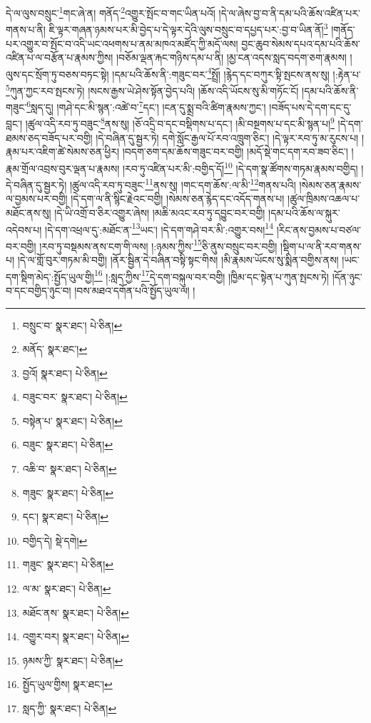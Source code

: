 དེ་ལ་ལུས་བསྲུང་\footnote{བསྲུང་བ་  སྣར་ཐང་།  པེ་ཅིན། }གང་ཞེ་ན། གནོད་\footnote{མནོད་  སྣར་ཐང་། }འགྱུར་སྤོང་བ་གང་ཡིན་པའོ། །དེ་ལ་ཞེས་བྱ་བ་ནི་དམ་པའི་ཆོས་འཛིན་པར་གནས་པ་ནི། ཇི་ལྟར་གཞན་ཉམས་པར་མི་བྱེད་པ་དེ་ལྟར་དེའི་ལུས་བསྲུང་བ་དཔྱད་པར་:བྱ་བ་ཡིན་ནོ།\footnote{བྱའོ།  སྣར་ཐང་།  པེ་ཅིན། } །གནོད་པར་འགྱུར་བ་སྤོང་བ་འདི་ཡང་འཕགས་པ་ནམ་མཁའ་མཛོད་ཀྱི་མདོ་ལས། བྱང་ཆུབ་སེམས་དཔའ་དམ་པའི་ཆོས་འཛིན་པ་ལ་བརྩོན་པ་རྣམས་ཀྱིས། །བཅོམ་ལྡན་རྐང་གཉིས་དམ་པ་ནི། །མྱ་ངན་འདས་སླད་བདག་ཅག་རྣམས། །ལུས་དང་སྲོག་ཏུ་བཅས་བཏང་སྟེ། །དམ་པའི་ཆོས་ནི་:གཟུང་བར་\footnote{བཟུང་བར་  སྣར་ཐང་།  པེ་ཅིན། }སྤྲོ། །རྙེད་དང་བཀུར་སྟི་སྤངས་ནས་སུ། །:རྟེན་པ་\footnote{བསྟེན་པ་  སྣར་ཐང་།  པེ་ཅིན། }ཀུན་ཀྱང་རབ་སྤངས་ཏེ། །སངས་རྒྱས་ཡེ་ཤེས་སྟོན་བྱེད་པའི། །ཆོས་འདི་ཡོངས་སུ་མི་གཏོང་ངོ། །དམ་པའི་ཆོས་ནི་གཟུང་\footnote{བཟུང་  སྣར་ཐང་།  པེ་ཅིན། }སླད་དུ། །གཤེ་དང་མི་སྙན་:འཚེ་བ་\footnote{འཆི་བ་  སྣར་ཐང་།  པེ་ཅིན། }དང་། །ངན་དུ་སྨྲ་བའི་ཚིག་རྣམས་ཀྱང་། །བཟོད་པས་དེ་དག་དང་དུ་བླང་། །ཚུལ་འདི་རབ་ཏུ་བཟུང་\footnote{གཟུང་  སྣར་ཐང་།  པེ་ཅིན། }ནས་སུ། །ཅོ་འདྲི་བ་དང་བསྡིགས་པ་དང་། །མི་བསྔགས་པ་དང་མི་སྙན་པ།\footnote{དང་།  སྣར་ཐང་།  པེ་ཅིན། } །དེ་དག་ཐམས་ཅད་བཟོད་པར་བགྱི། །དེ་བཞིན་དུ་སྦྱར་ཏེ། དགེ་སློང་རྒྱལ་པོ་རབ་འཁྲུག་ཅིང་། །དེ་ལྟར་རབ་ཏུ་མ་རུངས་པ། །རྣམ་པར་འཇིག་ཚེ་སེམས་ཅན་ཕྱིར། །བདག་ཅག་དམ་ཆོས་གཟུང་བར་བགྱི། །མདོ་སྡེ་གང་དག་རབ་ཟབ་ཅིང་། །རྣམ་གྲོལ་འབྲས་བུར་ལྡན་པ་རྣམས། །རབ་ཏུ་འཛིན་པར་མི་:བགྱིད་དོ།\footnote{བགྱིད་དེ།  སྡེ་དགེ། } །དེ་དག་སྣ་ཚོགས་གཏམ་རྣམས་བགྱིད། །དེ་བཞིན་དུ་སྦྱར་ཏེ། །ཚུལ་འདི་རབ་ཏུ་བཟུང་\footnote{གཟུང་  སྣར་ཐང་།  པེ་ཅིན། }ནས་སུ། །གང་དག་ཆོས་:ལ་མི་\footnote{ལ་མ་  སྣར་ཐང་།  པེ་ཅིན། }གནས་པའི། །སེམས་ཅན་རྣམས་ལ་བྱམས་པར་བགྱི། །དེ་དག་ལ་ནི་སྙིང་རྗེའང་བགྱི། །སེམས་ཅན་རྙེད་དང་འདོད་གནས་པ། །ཚུལ་ཁྲིམས་འཆལ་པ་མཐོང་ནས་སུ། །དེ་ཡི་འགྲོ་བ་ཅིར་འགྱུར་ཞེས། །མཆི་མའང་རབ་ཏུ་དབྱུང་བར་བགྱི། །དམ་པའི་ཆོས་ལ་སྐུར་འདེབས་པ། །དེ་དག་འཕྲལ་དུ་:མཐོང་ན་\footnote{མཐོང་ནས་  སྣར་ཐང་།  པེ་ཅིན། }ཡང་། །དེ་དག་གཤེ་བར་མི་:འགྱུར་བས།\footnote{འགྱུར་བར།  སྣར་ཐང་།  པེ་ཅིན། } །རིང་ནས་བྱམས་པ་བཙལ་བར་བགྱི། །རབ་ཏུ་བསྡམས་ནས་ངག་གི་ལས། །:ཉམས་ཀྱིས་\footnote{ཉམས་ཀྱི་  སྣར་ཐང་།  པེ་ཅིན། }ཅི་ནུས་བསྲུང་བར་བགྱི། །སྡིག་པ་ལ་ནི་རབ་གནས་པ། །དེ་ལ་གློ་བུར་གཏམ་མི་བགྱི། །ནོར་སྦྱིན་དེ་བཞིན་བསྟི་སྟང་གིས། །མི་རྣམས་ཡོངས་སུ་སྨིན་བགྱིས་ནས། །ཡང་དག་སྡིག་མེད་:སྤྱོད་ཡུལ་གྱི།\footnote{སྤྱོད་ཡུལ་གྱིས།  སྣར་ཐང་། } །:སླད་ཀྱིས་\footnote{སླད་ཀྱི་  སྣར་ཐང་།  པེ་ཅིན། }དེ་དག་བསྐུལ་བར་བགྱི། །ཁྱིམ་དང་སྟེན་པ་ཀུན་སྤངས་ཏེ། །དོན་ཉུང་བ་དང་བགྱིད་ཉུང་བ། །བས་མཐའ་དགོན་པའི་སྤྱོད་ཡུལ་ལ། །
